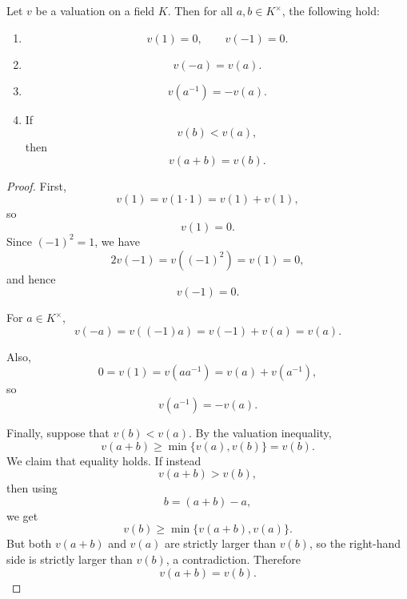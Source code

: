 \begin{proposition}
    Let \(v\) be a valuation on a field \(K\). Then for all \(a,b\in K^\times\), the
    following hold:
    \begin{enumerate}
        \item
              \[
                  v(1)=0,\qquad v(-1)=0.
              \]
        \item
              \[
                  v(-a)=v(a).
              \]
        \item
              \[
                  v(a^{-1})=-v(a).
              \]
        \item If
              \[
                  v(b)<v(a),
              \]
              then
              \[
                  v(a+b)=v(b).
              \]
    \end{enumerate}
\end{proposition}

\begin{proof}
    First,
    \[
        v(1)=v(1\cdot 1)=v(1)+v(1),
    \]
    so
    \[
        v(1)=0.
    \]
    Since \((-1)^2=1\), we have
    \[
        2v(-1)=v((-1)^2)=v(1)=0,
    \]
    and hence
    \[
        v(-1)=0.
    \]

    For \(a\in K^\times\),
    \[
        v(-a)=v((-1)a)=v(-1)+v(a)=v(a).
    \]

    Also,
    \[
        0=v(1)=v(aa^{-1})=v(a)+v(a^{-1}),
    \]
    so
    \[
        v(a^{-1})=-v(a).
    \]

    Finally, suppose that \(v(b)<v(a)\). By the valuation inequality,
    \[
        v(a+b)\geq \min\{v(a),v(b)\}=v(b).
    \]
    We claim that equality holds. If instead
    \[
        v(a+b)>v(b),
    \]
    then using
    \[
        b=(a+b)-a,
    \]
    we get
    \[
        v(b)\geq \min\{v(a+b),v(a)\}.
    \]
    But both \(v(a+b)\) and \(v(a)\) are strictly larger than \(v(b)\), so the right-hand
    side is strictly larger than \(v(b)\), a contradiction. Therefore
    \[
        v(a+b)=v(b).
    \]
\end{proof}




